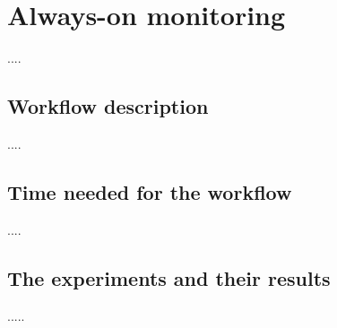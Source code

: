\section{Always-on monitoring}
\label{sec:monitor}
....

\subsection{Workflow description}
....

\subsection{Time needed for the workflow}
....

\subsection{The experiments and their results}
.....